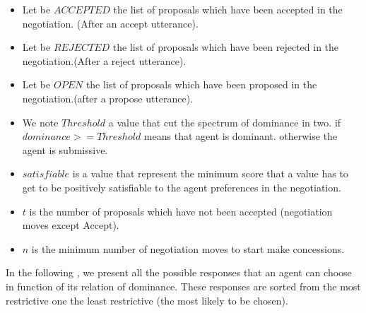 \documentclass{article}
\begin{document}
	\begin{itemize}
		\item Let be $ACCEPTED$ the list of proposals which have been accepted in the negotiation. (After an accept utterance).
		\item Let be $REJECTED$ the list of proposals which have been rejected in the negotiation.(After a reject utterance).
		\item Let be $OPEN$ the list of proposals which have been proposed in the negotiation.(after a propose utterance).
		\item We note $Threshold$ a value that cut the spectrum of dominance in two. if $dominance >= Threshold$ means that agent is dominant. otherwise the agent is submissive.
		\item $satisfiable$ is a value that represent the minimum score that a value has to get to be positively satisfiable to the agent preferences in the negotiation.
		\item $t$ is the number of proposals which have not been accepted (negotiation moves except Accept).
		\item $n$ is the minimum number of negotiation moves to start make concessions.
	\end{itemize}
	
	\par In the following , we present all the possible responses that an agent can choose in function of its relation of dominance. These responses are sorted from the most restrictive one the least restrictive (the most likely to be chosen).
\end{document}
